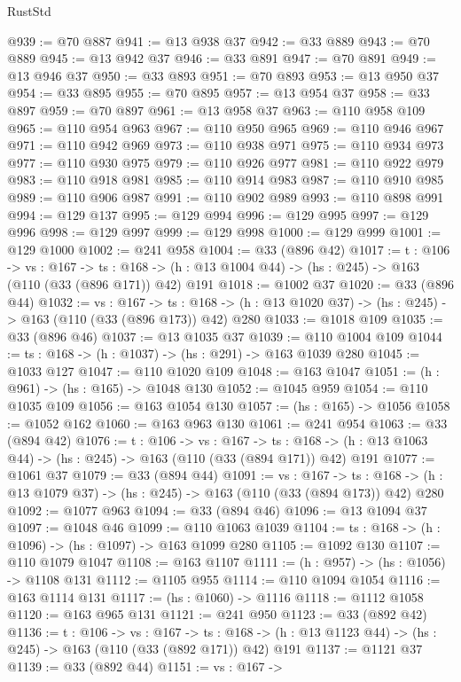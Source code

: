\begin{lexlean}{RustStd}
\begin{coremodule}
@939 := @70 @887
@941 := @13 @938 @37
@942 := @33 @889
@943 := @70 @889
@945 := @13 @942 @37
@946 := @33 @891
@947 := @70 @891
@949 := @13 @946 @37
@950 := @33 @893
@951 := @70 @893
@953 := @13 @950 @37
@954 := @33 @895
@955 := @70 @895
@957 := @13 @954 @37
@958 := @33 @897
@959 := @70 @897
@961 := @13 @958 @37
@963 := @110 @958 @109
@965 := @110 @954 @963
@967 := @110 @950 @965
@969 := @110 @946 @967
@971 := @110 @942 @969
@973 := @110 @938 @971
@975 := @110 @934 @973
@977 := @110 @930 @975
@979 := @110 @926 @977
@981 := @110 @922 @979
@983 := @110 @918 @981
@985 := @110 @914 @983
@987 := @110 @910 @985
@989 := @110 @906 @987
@991 := @110 @902 @989
@993 := @110 @898 @991
@994 := @129 @137
@995 := @129 @994
@996 := @129 @995
@997 := @129 @996
@998 := @129 @997
@999 := @129 @998
@1000 := @129 @999
@1001 := @129 @1000
@1002 := @241 @958
@1004 := @33 (@896 @42)
@1017 := {t : @106} ->
  {vs : @167} ->
  {ts : @168} -> (h : @13 @1004 @44) -> (hs : @245) -> @163 (@110 (@33 (@896 @171)) @42) @191
@1018 := @1002 @37
@1020 := @33 (@896 @44)
@1032 := {vs : @167} ->
  {ts : @168} -> (h : @13 @1020 @37) -> (hs : @245) -> @163 (@110 (@33 (@896 @173)) @42) @280
@1033 := @1018 @109
@1035 := @33 (@896 @46)
@1037 := @13 @1035 @37
@1039 := @110 @1004 @109
@1044 := {ts : @168} -> (h : @1037) -> (hs : @291) -> @163 @1039 @280
@1045 := @1033 @127
@1047 := @110 @1020 @109
@1048 := @163 @1047
@1051 := (h : @961) -> (hs : @165) -> @1048 @130
@1052 := @1045 @959
@1054 := @110 @1035 @109
@1056 := @163 @1054 @130
@1057 := (hs : @165) -> @1056
@1058 := @1052 @162
@1060 := @163 @963 @130
@1061 := @241 @954
@1063 := @33 (@894 @42)
@1076 := {t : @106} ->
  {vs : @167} ->
  {ts : @168} -> (h : @13 @1063 @44) -> (hs : @245) -> @163 (@110 (@33 (@894 @171)) @42) @191
@1077 := @1061 @37
@1079 := @33 (@894 @44)
@1091 := {vs : @167} ->
  {ts : @168} -> (h : @13 @1079 @37) -> (hs : @245) -> @163 (@110 (@33 (@894 @173)) @42) @280
@1092 := @1077 @963
@1094 := @33 (@894 @46)
@1096 := @13 @1094 @37
@1097 := @1048 @46
@1099 := @110 @1063 @1039
@1104 := {ts : @168} -> (h : @1096) -> (hs : @1097) -> @163 @1099 @280
@1105 := @1092 @130
@1107 := @110 @1079 @1047
@1108 := @163 @1107
@1111 := (h : @957) -> (hs : @1056) -> @1108 @131
@1112 := @1105 @955
@1114 := @110 @1094 @1054
@1116 := @163 @1114 @131
@1117 := (hs : @1060) -> @1116
@1118 := @1112 @1058
@1120 := @163 @965 @131
@1121 := @241 @950
@1123 := @33 (@892 @42)
@1136 := {t : @106} ->
  {vs : @167} ->
  {ts : @168} -> (h : @13 @1123 @44) -> (hs : @245) -> @163 (@110 (@33 (@892 @171)) @42) @191
@1137 := @1121 @37
@1139 := @33 (@892 @44)
@1151 := {vs : @167} ->

\end{coremodule}
\end{lexlean}
